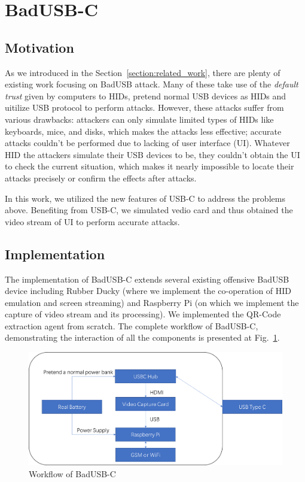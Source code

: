 \section{BadUSB-C}

\subsection{Motivation}
As we introduced in the Section~\ref{section:related_work}, there are plenty of existing work  focusing on BadUSB attack. 
Many of these take use of the \textit{default trust} given by computers to HIDs, pretend normal USB devices as HIDs and uitilize USB protocol to perform attacks. 
However, these attacks suffer from various drawbacks:
 attackers can only simulate limited types of HIDs like keyboards, mice, and disks, which makes the attacks less effective;
 accurate attacks couldn't be performed due to lacking of user interface (UI).
Whatever HID the attackers simulate their USB devices to be, they couldn't obtain the UI to check the current situation, which makes it nearly impossible to locate their attacks precisely or confirm the effects after attacks.

In this work, we utilized the new features of USB-C to address the problems above.
Benefiting from USB-C, we simulated vedio card and thus obtained the video stream of UI to perform accurate attacks.

\subsection{Implementation}
The implementation of BadUSB-C extends several existing offensive BadUSB device including Rubber Ducky (where we implement the co-operation of HID emulation and screen streaming) and Raspberry Pi (on which we implement the capture of video stream and its processing). We implemented the QR-Code extraction agent from scratch. The complete workflow of BadUSB-C, demonstrating the interaction of all the components is presented at Fig.~\ref{workflow}.

\begin{figure}[htbp]
\includegraphics[width=\linewidth]{./Figs/workflow.png}
\caption{Workflow of BadUSB-C}
\label{workflow}
\end{figure}

